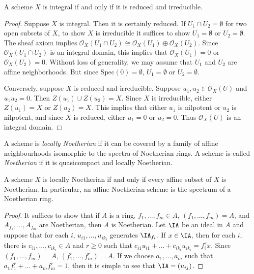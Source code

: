 \begin{theorem}
    A scheme $X$ is integral if and only if it is reduced and irreducible.
\end{theorem}
\begin{proof}
    Suppose $X$ is integral. Then it is certainly reduced. If $U_1 \cap U_2 = \emptyset$ for two open subsets of $X$, to show $X$ is irreducible it suffices to show $U_1 = \emptyset$ or $U_2 = \emptyset$. The sheaf axiom implies $\mathcal{O}_X(U_1 \cap U_2) \cong \mathcal{O}_X(U_1) \oplus \mathcal{O}_X(U_2)$. Since $\mathcal{O}_X(U_1 \cap U_2)$ is an integral domain, this implies that $\mathcal{O}_X(U_1) = 0$ or $\mathcal{O}_X(U_2) = 0$. Without loss of generality, we may assume that $U_1$ and $U_2$ are affine neighborhoods. But since $\text{Spec}(0) = \emptyset$, $U_1 = \emptyset$ or $U_2 = \emptyset$.

    Conversely, suppose $X$ is reduced and irreducible. Suppose $u_1,u_2 \in \mathcal{O}_X(U)$ and $u_1u_2 = 0$. Then $Z(u_1) \cup Z(u_2) = X$. Since $X$ is irreducible, either $Z(u_1) = X$ or $Z(u_2) = X$. This implies that either $u_1$ is nilpotent or $u_2$ is nilpotent, and since $X$ is reduced, either $u_1 = 0$ or $u_2 = 0$. Thus $\mathcal{O}_X(U)$ is an integral domain.
\end{proof}

A scheme is \emph{locally Noetherian} if it can be covered by a family of affine neighbourhoods isomorphic to the spectra of Noetherian rings. A scheme is called \emph{Noetherian} if it is quasicompact and locally Noetherian.

\begin{theorem}
    A scheme $X$ is locally Noetherian if and only if every affine subset of $X$ is Noetherian. In particular, an affine Noetherian scheme is the spectrum of a Noetherian ring.
\end{theorem}
\begin{proof}
    It suffices to show that if $A$ is a ring, $f_1,\dots,f_m \in A$, $(f_1,\dots,f_m) = A$, and $A_{f_1},\dots, A_{f_m}$ are Noetherian, then $A$ is Noetherian. Let $\IA$ be an ideal in $A$ and suppose that for each $i$, $u_{i1},\dots,u_{ik_i}$ generates $\IA_{f_i}$. If $x \in \IA$, then for each $i$, there is $c_{i1}, \dots, c_{ik_i} \in A$ and $r \geq 0$ such that $c_{i1} u_{i1} + \dots + c_{ik_i} u_{ik_i} = f_i^r x$. Since $(f_1,\dots,f_m) = A$, $(f_1^r, \dots, f_m^r) = A$. If we choose $a_1,\dots,a_m$ such that $a_1 f_1^r + \dots + a_m f_m^r = 1$, then it is simple to see that $\IA = (u_{ij})$.
\end{proof}





